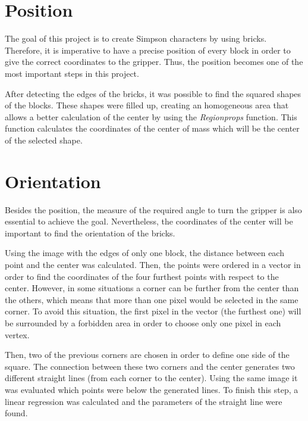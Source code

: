 \section{Position}
The goal of this project is to create Simpson characters by using bricks. Therefore, it is imperative to have a precise position of every block in order to give the correct coordinates to the gripper. Thus, the position becomes one of the most important steps in this project.

After detecting the edges of the bricks, it was possible to find the squared shapes of the blocks. These shapes were filled up, creating an homogeneous area that allows a better calculation of the center by using the \textit{Regionprops} function. This function calculates the coordinates of the center of mass which will be the center of the selected shape.

\section{Orientation}
Besides the position, the measure of the required angle to turn the gripper is also essential to achieve the goal. Nevertheless, the coordinates of the center will be important to find the orientation of the bricks. 

Using the image with the edges of only one block, the distance between each point and the center was calculated. Then, the points were ordered in a vector in order to find the coordinates of the four furthest points with respect to the center. However, in some situations a corner can be further from the center than the others, which means that more than one pixel would be selected in the same corner. To avoid this situation, the first pixel in the vector (the furthest one) will be surrounded by a forbidden area in order to choose only one pixel in each vertex.

Then, two of the previous corners are chosen in order to define one side of the square. The connection between these two corners and the center generates two different straight lines (from each corner to the center). Using the same image it was evaluated which points were below the generated lines. To finish this step, a linear regression was calculated and the parameters of the straight line were found.

